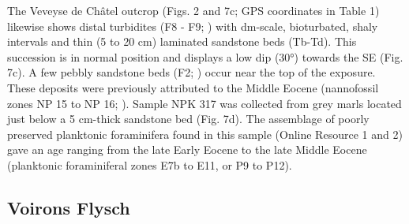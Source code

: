 \documentclass[twoside]{article}
\begin{document}
The Veveyse de Châtel outcrop (Figs. 2 and 7c; GPS coordinates in Table 1) likewise shows distal turbidites (F8 - F9; \citealp{Mutti2003}) with dm-scale, bioturbated, shaly intervals and thin (5 to 20 cm) laminated sandstone beds (Tb-Td). This succession is in normal position and displays a low dip (30°) towards the SE (Fig. 7c). A few pebbly sandstone beds (F2; \citealp{Mutti2003}) occur near the top of the exposure. These deposits were previously attributed to the Middle Eocene (nannofossil zones NP 15 to NP 16; \citealp{Weidmann1976a,Morel1980b}). Sample NPK 317 was collected from grey marls located just below a 5 cm-thick sandstone bed (Fig. 7d). The assemblage of poorly preserved planktonic foraminifera found in this sample (Online Resource 1 and 2) gave an age ranging from the late Early Eocene to the late Middle Eocene (planktonic foraminiferal zones E7b to E11, or P9 to P12).\par

\subsection{Voirons Flysch}
\end{document}
